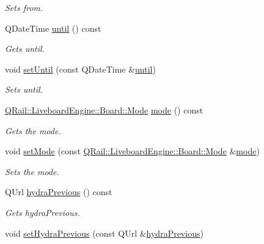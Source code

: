 \begin{DoxyCompactItemize}
\begin{DoxyCompactList}\small\item\em Sets from. \end{DoxyCompactList}\item 
Q\+Date\+Time \mbox{\hyperlink{classQRail_1_1LiveboardEngine_1_1Board_af09d8cddaaf92ba4a3a5d74ee393388b}{until}} () const
\begin{DoxyCompactList}\small\item\em Gets until. \end{DoxyCompactList}\item 
void \mbox{\hyperlink{classQRail_1_1LiveboardEngine_1_1Board_a1739cf48ec910b5ee0394d30c7ade72b}{set\+Until}} (const Q\+Date\+Time \&\mbox{\hyperlink{classQRail_1_1LiveboardEngine_1_1Board_af09d8cddaaf92ba4a3a5d74ee393388b}{until}})
\begin{DoxyCompactList}\small\item\em Sets until. \end{DoxyCompactList}\item 
\mbox{\hyperlink{classQRail_1_1LiveboardEngine_1_1Board_a0ab6d318f405895f62c6e98cb2d86c6e}{Q\+Rail\+::\+Liveboard\+Engine\+::\+Board\+::\+Mode}} \mbox{\hyperlink{classQRail_1_1LiveboardEngine_1_1Board_a72d581701ab9d478f7e1943d0d3effb4}{mode}} () const
\begin{DoxyCompactList}\small\item\em Gets the mode. \end{DoxyCompactList}\item 
void \mbox{\hyperlink{classQRail_1_1LiveboardEngine_1_1Board_a64e85afaca570209ba08a350460315d2}{set\+Mode}} (const \mbox{\hyperlink{classQRail_1_1LiveboardEngine_1_1Board_a0ab6d318f405895f62c6e98cb2d86c6e}{Q\+Rail\+::\+Liveboard\+Engine\+::\+Board\+::\+Mode}} \&\mbox{\hyperlink{classQRail_1_1LiveboardEngine_1_1Board_a72d581701ab9d478f7e1943d0d3effb4}{mode}})
\begin{DoxyCompactList}\small\item\em Sets the mode. \end{DoxyCompactList}\item 
Q\+Url \mbox{\hyperlink{classQRail_1_1LiveboardEngine_1_1Board_a7a89e2b711234a6a0969bee75d4a567e}{hydra\+Previous}} () const
\begin{DoxyCompactList}\small\item\em Gets hydra\+Previous. \end{DoxyCompactList}\item 
void \mbox{\hyperlink{classQRail_1_1LiveboardEngine_1_1Board_af8c481758c476c1e3bf471e87ba31613}{set\+Hydra\+Previous}} (const Q\+Url \&\mbox{\hyperlink{classQRail_1_1LiveboardEngine_1_1Board_a7a89e2b711234a6a0969bee75d4a567e}{hydra\+Previous}})

\end{DoxyCompactItemize}
